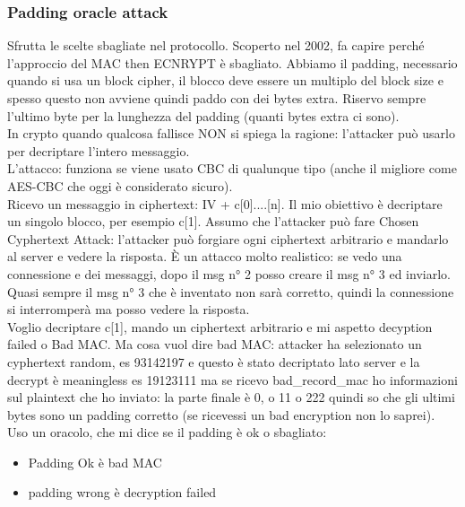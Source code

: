 \documentclass[16px]{article}
\begin{document}
\subsubsection{Padding oracle attack}
Sfrutta le scelte sbagliate nel protocollo. Scoperto nel 2002, fa capire perché l'approccio del MAC then ECNRYPT è sbagliato. Abbiamo il padding, necessario quando si usa un block cipher, il blocco deve essere un multiplo del block size e spesso questo non avviene quindi paddo con dei bytes extra. Riservo sempre l'ultimo byte per la lunghezza del padding (quanti bytes extra ci sono).\\ In crypto quando qualcosa fallisce NON si spiega la ragione: l'attacker può usarlo per decriptare l'intero messaggio.\\ L'attacco: funziona se viene usato CBC di qualunque tipo (anche il migliore come AES-CBC che oggi è considerato sicuro).\\ Ricevo un messaggio in ciphertext: IV + c[0]....[n]. Il mio obiettivo è decriptare un singolo blocco, per esempio c[1]. Assumo che l'attacker può fare Chosen Cyphertext Attack: l'attacker può forgiare ogni ciphertext arbitrario e mandarlo al server e vedere la risposta. È un attacco molto realistico: se vedo una connessione e dei messaggi, dopo il msg n° 2 posso creare il msg n° 3 ed inviarlo. Quasi sempre il msg n° 3 che è inventato non sarà corretto, quindi la connessione si interromperà ma posso vedere la risposta.\\ Voglio decriptare c[1], mando un ciphertext arbitrario e mi aspetto decyption failed o Bad MAC. Ma cosa vuol dire bad MAC: attacker ha selezionato un cyphertext random, es 93142197 e questo è stato decriptato lato server e la decrypt è meaningless es 19123111 ma se ricevo bad\_record\_mac ho informazioni sul plaintext che ho inviato: la parte finale è 0, o 11 o 222 quindi so che gli ultimi bytes sono un padding corretto (se ricevessi un bad encryption non lo saprei).\\ Uso un oracolo, che mi dice se il padding è ok o sbagliato:
\begin{itemize}
\item Padding Ok è bad MAC
\item padding wrong è decryption failed
\end{itemize}
\end{document}
